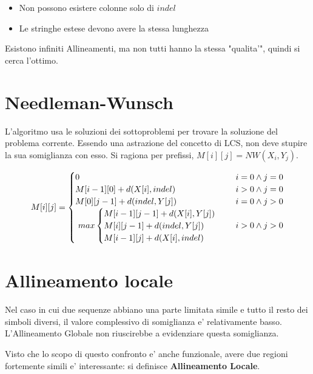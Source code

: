 \begin{itemize}
    \item Non possono esistere colonne solo di $indel$
    \item Le stringhe estese devono avere la stessa lunghezza
\end{itemize}

Esistono infiniti Allineamenti, ma non tutti hanno la stessa "qualita'", quindi si cerca l'ottimo.

\section{Needleman-Wunsch}

L'algoritmo usa le soluzioni dei sottoproblemi per trovare la soluzione del problema corrente.
Essendo una astrazione del concetto di LCS, non deve stupire la sua somiglianza con esso.
Si ragiona per prefissi, $M[i][j] = NW(X_i, Y_j)$.

\[
    M[i][j] =
    \begin{cases}
        \text{$0$} & \text{$i = 0 \land j = 0$} \\
        \text{$M[i-1][0] + d(X[i], indel)$} & \text{$i > 0 \land j = 0$} \\
        \text{$M[0][j-1] + d(indel, Y[j])$} & \text{$i = 0 \land j > 0$} \\
        \text{
            $
                max 
                \begin{cases}
                    M[i-1][j-1] + d(X[i], Y[j]) \\
                    M[i][j-1] + d(indel, Y[j]) \\
                    M[i-1][j] + d(X[i], indel) \\
                \end{cases}
            $
        } & \text{$i > 0 \land j > 0$}
    \end{cases}
\]

\section{Allineamento locale}

Nel caso in cui due sequenze abbiano una parte limitata simile e tutto il resto dei simboli diversi, il valore complessivo di somiglianza e' relativamente basso.
L'Allineamento Globale non riuscirebbe a evidenziare questa somiglianza.

Visto che lo scopo di questo confronto e' anche funzionale, avere due regioni fortemente simili e' interessante: si definisce \textbf{Allineamento Locale}.


